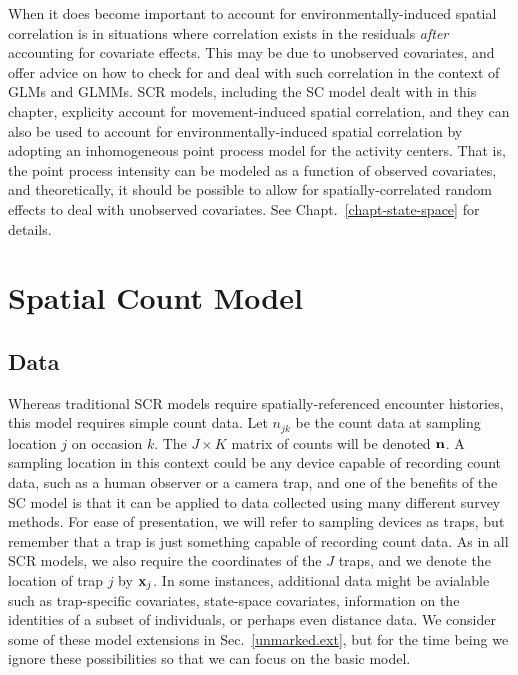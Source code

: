 When it does become
important to account for environmentally-induced spatial correlation
is in situations where correlation exists in the residuals
\textit{after} accounting for covariate effects. This may be due to
unobserved covariates, and \citet{zuur_etal:2009} offer advice on
how to check for and deal with such correlation in the context of
GLMs and GLMMs. %
SCR models, including the SC model dealt with in this
chapter, explicity account for movement-induced spatial
correlation, and they can also be used to account for
environmentally-induced spatial correlation by adopting an
inhomogeneous point process model for the activity centers. That is,
the point process intensity can be modeled as a function of observed
covariates, and theoretically, it should be possible to allow for
spatially-correlated random effects to deal with unobserved covariates.
See Chapt.~\ref{chapt-state-space} for details.





\section{Spatial Count Model}

\subsection{Data}

Whereas traditional SCR models require spatially-referenced
encounter histories, this model requires simple count data.
Let $n_{jk}$ be the count data at sampling location $j$ %
on occasion $k$. %
The $J \times K$ matrix of
counts will be denoted $\bf{n}$. A sampling location in this context
could be any device capable of recording count data, such as a
human observer or a camera trap, and
one of the benefits of the SC model is that it
can be applied to data collected using many different survey
methods. For ease of presentation, we will refer to sampling devices
as traps, but remember that a trap is just something capable of
recording count data. As in all SCR models, we also require the
coordinates of the $J$ traps, and we denote the location of trap $j$
by ${\bf x}_j$. In some instances, additional data might be avialable such as
trap-specific covariates, state-space covariates,
information on the identities of a subset of individuals, or perhaps
even distance data. We consider some of these model extensions in
Sec.~\ref{unmarked.ext}, but for the time being we ignore these %
possibilities so that we can focus on the basic model.

